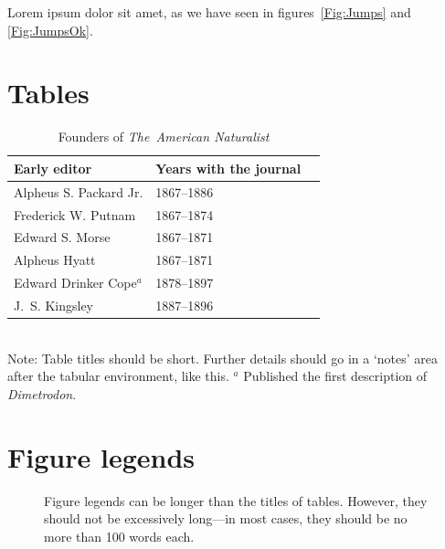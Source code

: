 \documentclass[11pt]{article}
\begin{document}
Lorem ipsum dolor sit amet, as we have seen in figures~\ref{Fig:Jumps} and \ref{Fig:JumpsOk}.


%
%
\newpage{}



\newpage{}

\section*{Tables}
\renewcommand{\thetable}{\arabic{table}}
\setcounter{table}{0}

\begin{table}[h]
\caption{Founders of \textit{The~American Naturalist}}
\label{Table:Founders}
\centering
\begin{tabular}{lll}\hline
Early editor            & Years with the journal \\ \hline
Alpheus S. Packard Jr.  & 1867--1886 \\
Frederick W. Putnam     & 1867--1874 \\ 
Edward S. Morse         & 1867--1871 \\ 
Alpheus Hyatt           & 1867--1871 \\
Edward Drinker Cope$^a$ & 1878--1897 \\
J.~S. Kingsley          & 1887--1896 \\ \hline 
\end{tabular}
\bigskip{}
\\
{\footnotesize Note: Table titles should be short. Further details should go in a `notes' area after the tabular environment, like this. $^a$ Published the first description of \textit{Dimetrodon}.}
\end{table}

\newpage{}

\section*{Figure legends}

\begin{figure}[h!]
\caption{Figure legends can be longer than the titles of tables. However, they should not be excessively long---in most cases, they should be no more than 100 words each.}
\label{Fig:OkapiHorn}
\end{figure}
\end{document}
